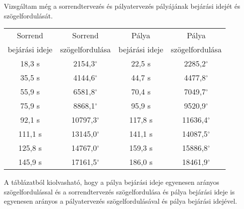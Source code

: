 Vizsgáltam még a sorrendtervezés és pályatervezés pályájának bejárási idejét és szögelfordulását.
\begin{center}
 \begin{tabular}{ |c|c|c|c| } 
 \hline
Sorrend  & Sorrend & Pálya & Pálya \\
bejárási ideje & szögelfordulása&bejárási ideje & szögelfordulása\\
\hline

18,3 s&	2154,3$^{\circ}$ &	22,5 s&	2285,2$^{\circ}$ \\
35,5 s&	4144,6$^{\circ}$ &	44,7 s&	4477,8$^{\circ}$ \\
55,9 s& 6581,8$^{\circ}$ &	70,4 s&	7049,7$^{\circ}$ \\
75,9 s&	8868,1$^{\circ}$ &	95,9 s&	9520,9$^{\circ}$ \\
92,1 s&	10797,3$^{\circ}$ &	117,8 s&	11636,4$^{\circ}$ \\
111,1 s&	13145,0$^{\circ}$ &	141,1 s&	14087,5$^{\circ}$ \\
125,8 s&	14767,0$^{\circ}$  &	159,3 s&	15886,8$^{\circ}$ \\
145,9 s&	17161,5$^{\circ}$ &	186,0 s&	18461,9$^{\circ}$ \\

\hline
\end{tabular}
\end{center}

A táblázatból kiolvasható, hogy a pálya bejárási ideje egyenesen arányos szögelfordulással és a sorrendtervezés szögelfordulása és pálya bejárási ideje is egyenesen arányos a pályatervezés szögelfordulásával és pálya bejárási idejével.



